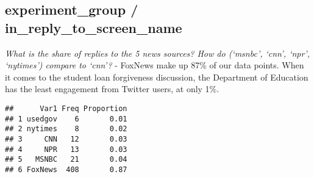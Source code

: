 \documentclass[
]{article}
\newenvironment{Shaded}{\begin{snugshade}}{\end{snugshade}}
\newcommand{\AttributeTok}[1]{\textcolor[rgb]{0.77,0.63,0.00}{#1}}
\newcommand{\DecValTok}[1]{\textcolor[rgb]{0.00,0.00,0.81}{#1}}
\newcommand{\FunctionTok}[1]{\textcolor[rgb]{0.00,0.00,0.00}{#1}}
\newcommand{\NormalTok}[1]{#1}
\newcommand{\OtherTok}[1]{\textcolor[rgb]{0.56,0.35,0.01}{#1}}
\newcommand{\SpecialCharTok}[1]{\textcolor[rgb]{0.00,0.00,0.00}{#1}}
\newcommand{\StringTok}[1]{\textcolor[rgb]{0.31,0.60,0.02}{#1}}
\begin{document}
\hypertarget{experiment_group-in_reply_to_screen_name}{%
\subsection{experiment\_group /
in\_reply\_to\_screen\_name}\label{experiment_group-in_reply_to_screen_name}}

\emph{What is the share of replies to the 5 news sources? How do
(`msnbc', `cnn', `npr', `nytimes') compare to `cnn'?} - FoxNews make up
87\% of our data points. When it comes to the student loan forgiveness
discussion, the Department of Education has the least engagement from
Twitter users, at only 1\%.

\begin{Shaded}
\end{Shaded}

\begin{verbatim}
##      Var1 Freq Proportion
## 1 usedgov    6       0.01
## 2 nytimes    8       0.02
## 3     CNN   12       0.03
## 4     NPR   13       0.03
## 5   MSNBC   21       0.04
## 6 FoxNews  408       0.87
\end{verbatim}

\begin{Shaded}
\end{Shaded}
\end{document}
